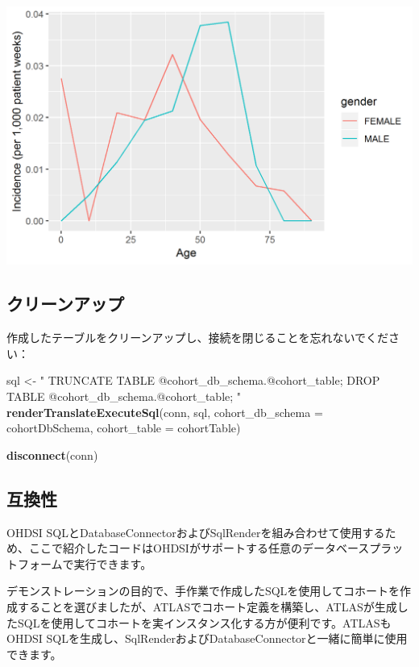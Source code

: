 \documentclass[
  11pt]{book}
\newenvironment{Shaded}{\begin{snugshade}}{\end{snugshade}}
\newcommand{\AttributeTok}[1]{\textcolor[rgb]{0.13,0.29,0.53}{#1}}
\newcommand{\FunctionTok}[1]{\textcolor[rgb]{0.13,0.29,0.53}{\textbf{#1}}}
\newcommand{\NormalTok}[1]{#1}
\newcommand{\OtherTok}[1]{\textcolor[rgb]{0.56,0.35,0.01}{#1}}
\newcommand{\StringTok}[1]{\textcolor[rgb]{0.31,0.60,0.02}{#1}}
\theoremstyle{definition}
\theoremstyle{definition}
\theoremstyle{definition}
\theoremstyle{definition}
\theoremstyle{remark}
\begin{document}
\begin{center}\includegraphics[width=0.8\linewidth]{images/SqlAndR/ir} \end{center}

\subsection{クリーンアップ}\label{ux30afux30eaux30fcux30f3ux30a2ux30c3ux30d7}

作成したテーブルをクリーンアップし、接続を閉じることを忘れないでください：

\begin{Shaded}
\begin{Highlighting}[]
\NormalTok{sql }\OtherTok{\textless{}{-}} \StringTok{"}
\StringTok{TRUNCATE TABLE @cohort\_db\_schema.@cohort\_table;}
\StringTok{DROP TABLE @cohort\_db\_schema.@cohort\_table;}
\StringTok{"}
\FunctionTok{renderTranslateExecuteSql}\NormalTok{(conn, sql,}
                          \AttributeTok{cohort\_db\_schema =}\NormalTok{ cohortDbSchema,}
                          \AttributeTok{cohort\_table =}\NormalTok{ cohortTable)}

\FunctionTok{disconnect}\NormalTok{(conn)}
\end{Highlighting}
\end{Shaded}

\subsection{互換性}\label{ux4e92ux63dbux6027}

OHDSI SQLとDatabaseConnectorおよびSqlRenderを組み合わせて使用するため、ここで紹介したコードはOHDSIがサポートする任意のデータベースプラットフォームで実行できます。

デモンストレーションの目的で、手作業で作成したSQLを使用してコホートを作成することを選びましたが、ATLASでコホート定義を構築し、ATLASが生成したSQLを使用してコホートを実インスタンス化する方が便利です。ATLASもOHDSI SQLを生成し、SqlRenderおよびDatabaseConnectorと一緒に簡単に使用できます。
\end{document}
